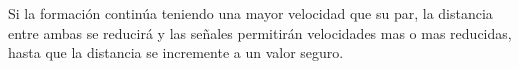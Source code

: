 	
	Si la formación continúa teniendo una mayor velocidad que su par, la distancia entre ambas se reducirá y las señales permitirán velocidades mas o mas reducidas, hasta que la distancia se incremente a un valor seguro.
